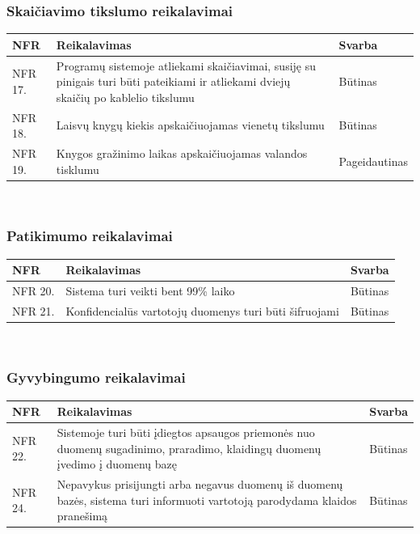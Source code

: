 \documentclass{VUMIFPSkursinis}
\begin{document}
    \subsubsection{Skaičiavimo tikslumo reikalavimai}
    \noindent
    \begin{centering}
    	\begin{tabular}{ | p{} | p{} | p{} |}
    		\hline
   			NFR & Reikalavimas & Svarba       \\ \hline
		  	NFR 17. & Programų sistemoje atliekami skaičiavimai, susiję su pinigais turi būti pateikiami ir atliekami dviejų skaičių po kablelio tikslumu & Būtinas \\ \hline
            NFR 18. & Laisvų knygų kiekis apskaičiuojamas vienetų tikslumu & Būtinas \\ \hline
            NFR 19. & Knygos gražinimo laikas apskaičiuojamas valandos tisklumu & Pageidautinas \\ \hline
   		\end{tabular}\\
    \end{centering}
    
    \subsubsection{Patikimumo reikalavimai}
    \noindent
    \begin{centering}
    	\begin{tabular}{ | p{} | p{} | p{} |}
    		\hline
   			NFR & Reikalavimas & Svarba       \\ \hline
		  	NFR 20. & Sistema turi veikti bent 99\% laiko & Būtinas \\ \hline
            NFR 21. & Konfidencialūs vartotojų duomenys turi būti šifruojami & Būtinas \\ \hline
   		\end{tabular}\\
    \end{centering}
    
    \subsubsection{Gyvybingumo reikalavimai}
    \noindent
    \begin{centering}
    	\begin{tabular}{ | p{} | p{} | p{} |}
    		\hline
   			NFR & Reikalavimas & Svarba       \\ \hline
		  	NFR 22. & Sistemoje turi būti įdiegtos apsaugos priemonės nuo duomenų sugadinimo, praradimo, klaidingų duomenų įvedimo į duomenų bazę & Būtinas \\ \hline
            NFR 24. & Nepavykus prisijungti arba negavus duomenų iš duomenų bazės, sistema turi informuoti vartotoją parodydama klaidos pranešimą & Būtinas \\ \hline
   		\end{tabular}\\
    \end{centering}
    
\end{document}
